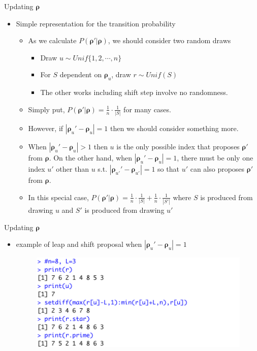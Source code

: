 \documentclass[11pt]{beamer}
\begin{document}
\begin{frame}{Updating $\boldsymbol{\rho}$}
\begin{itemize}
    \item Simple representation for the transition probability
        \begin{itemize}
            \item As we calculate $P(\boldsymbol{\rho}'|\boldsymbol{\rho})$, we should consider two random draws
            \begin{itemize}
                \item Draw $u\sim Unif\{1,2,\cdots, n\}$
                \item For $S$ dependent on $\boldsymbol{\rho}_u$, draw $r\sim Unif(S)$
                \item The other works including shift step involve no randomness.
            \end{itemize}
            \item Simply put, $P(\boldsymbol{\rho}'|\boldsymbol{\rho})=\frac{1}{n}\cdot\frac{1}{|S|}$ for many cases.
            \item However, if $|\boldsymbol{\rho}_u'-\boldsymbol{\rho}_u|=1$ then we should consider something more. 
            \item When $|\boldsymbol{\rho}_u'-\boldsymbol{\rho}_u|>1$ then $u$ is the only possible index that proposes $\boldsymbol{\rho}'$ from $\boldsymbol{\rho}$. On the other hand, when $|\boldsymbol{\rho}_u'-\boldsymbol{\rho}_u|=1$, there must be only one index $u'$ other than $u$ s.t. $|\boldsymbol{\rho}_{u'}'-\boldsymbol{\rho}_{u'}|=1$ so that $u'$ can also proposes $\boldsymbol{\rho}'$ from $\boldsymbol{\rho}$.
            \item In this special case, $P(\boldsymbol{\rho}'|\boldsymbol{\rho})=\frac{1}{n}\cdot\frac{1}{|S|}+\frac{1}{n}\cdot\frac{1}{|S'|}$ where $S$ is produced from drawing $u$ and $S'$ is produced from drawing $u'$
        \end{itemize}
\end{itemize}
\end{frame}

\begin{frame}{Updating $\boldsymbol{\rho}$}
\begin{itemize}
    \item example of leap and shift proposal  when $|\boldsymbol{\rho}_u'-\boldsymbol{\rho}_u|=1$
    \begin{figure}
        \includegraphics{LSproposal1.png}
    \end{figure}
\end{itemize}
\end{frame}
\end{document}
